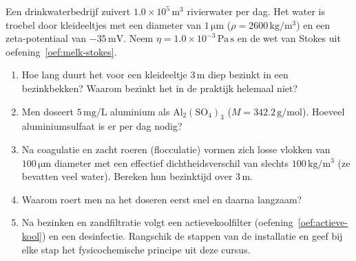 \begin{oefening}
Een drinkwaterbedrijf zuivert \(1.0\times10^{5}\,\mathrm{m^3}\) rivierwater per dag. Het water is troebel door kleideeltjes met een diameter van \(1\,\mathrm{\mu m}\) (\(\rho = 2600\,\mathrm{kg/m^3}\)) en een zeta-potentiaal van \(-35\,\mathrm{mV}\). Neem \(\eta = 1.0\times10^{-3}\,\mathrm{Pa\,s}\) en de wet van Stokes uit oefening~\ref{oef:melk-stokes}.

\begin{enumerate}
\item[(a)]
  Hoe lang duurt het voor een kleideeltje \(3\,\mathrm{m}\) diep bezinkt in een bezinkbekken? Waarom bezinkt het in de praktijk helemaal niet?
\item[(b)]
  Men doseert \(5\,\mathrm{mg/L}\) aluminium als \(\mathrm{Al_2(SO_4)_3}\) (\(M = 342.2\,\mathrm{g/mol}\)). Hoeveel aluminiumsulfaat is er per dag nodig?
\item[(c)]
  Na coagulatie en zacht roeren (flocculatie) vormen zich losse vlokken van \(100\,\mathrm{\mu m}\) diameter met een effectief dichtheidsverschil van slechts \(100\,\mathrm{kg/m^3}\) (ze bevatten veel water). Bereken hun bezinktijd over \(3\,\mathrm{m}\).
\item[(d)]
  Waarom roert men na het doseren eerst snel en daarna langzaam?
\item[(e)]
  Na bezinken en zandfiltratie volgt een actievekoolfilter (oefening~\ref{oef:actieve-kool}) en een desinfectie. Rangschik de stappen van de installatie en geef bij elke stap het fysicochemische principe uit deze cursus.
\end{enumerate}
\end{oefening}
